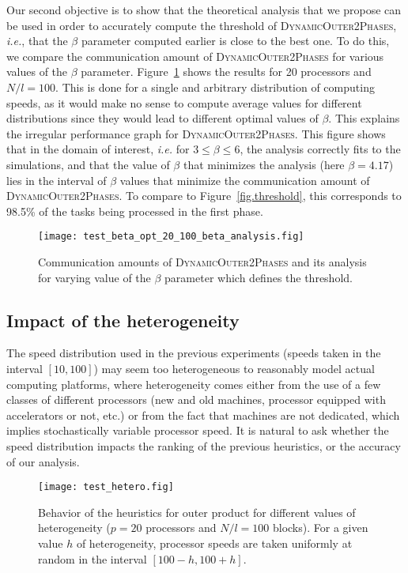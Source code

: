 \documentclass[a4paper,10pt]{article}
\newcommand{\ie}{{\it i.e.}\xspace}
\newcommand{\stupidthreshold}{\textsc{Dynamic\-Outer\-2Phases}\xspace}
\begin{document}
Our second objective is to show that the theoretical analysis that we propose can be used in order to accurately
compute the threshold of \stupidthreshold, \ie, that the $\beta$
parameter computed earlier is close to the best one. To do this, we
compare the communication amount of \stupidthreshold for various
values of the $\beta$ parameter. Figure~\ref{fig.beta} shows the
results for 20 processors and $N/l=100$. This is done for a single and
arbitrary distribution of computing speeds, as it would make no sense
to compute average values for different distributions since they would lead to
different optimal values of $\beta$. This explains the irregular
performance graph for \stupidthreshold.  This figure shows that in the
domain of interest, \ie for $3\leq \beta \leq 6$, the analysis
correctly fits to the simulations, and that the value of $\beta$ that
minimizes the analysis (here $\beta = 4.17$) lies in the interval of
$\beta$ values that minimize the communication amount of
\stupidthreshold. To compare to Figure~\ref{fig.threshold}, this
corresponds to 98.5\% of the tasks being processed in the first phase.


\begin{figure}[htbp]
  \centering
  \texttt{[image: test\_beta\_opt\_20\_100\_beta\_analysis.fig]}
  \caption{Communication amounts of \stupidthreshold and its analysis
    for varying value of the $\beta$ parameter which defines the
    threshold.}
  \label{fig.beta}
\end{figure}

\subsection{Impact of the heterogeneity}
\label{hetero-models}

The speed distribution used in the previous experiments (speeds taken
in the interval $[10,100]$) may seem too heterogeneous to  reasonably
model actual computing platforms, where heterogeneity comes either
from the use of a few classes of different processors (new and old
machines, processor equipped with accelerators or not, etc.) or from
the fact that machines are not dedicated, which implies stochastically
variable processor speed. It is natural to ask whether the speed
distribution impacts the ranking of the previous heuristics, or the
accuracy of our analysis.

\begin{figure}[htbp]
  \centering
  \texttt{[image: test\_hetero.fig]}
  \caption{Behavior of the heuristics for outer product for different
    values of heterogeneity ($p=20$ processors and $N/l=100$ blocks). For a given value
    $h$ of heterogeneity, processor speeds are taken uniformly at
    random in the interval $[100-h, 100+h]$. }
  \label{fig.hetero}
\end{figure}
\end{document}
